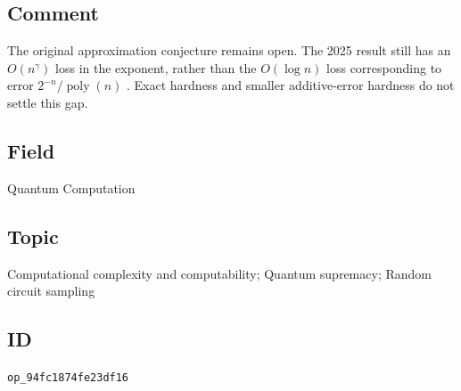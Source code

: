 \subsection*{Comment}

The original approximation conjecture remains open. The 2025 result still
has an $O(n^\gamma)$ loss in the exponent, rather than the $O(\log n)$
loss corresponding to error $2^{-n}/\operatorname{poly}(n)$
. Exact hardness and smaller additive-error
hardness do not settle this gap.

\subsection*{Field}

Quantum Computation

\subsection*{Topic}

Computational complexity and computability; Quantum supremacy; Random circuit sampling

\subsection*{ID}

\texttt{op\_94fc1874fe23df16}
